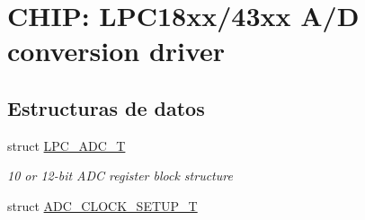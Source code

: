 \hypertarget{group___a_d_c__18_x_x__43_x_x}{}\section{C\+H\+IP\+: L\+P\+C18xx/43xx A/D conversion driver}
\label{group___a_d_c__18_x_x__43_x_x}
\subsection*{Estructuras de datos}
\begin{DoxyCompactItemize}
\item 
struct \hyperlink{struct_l_p_c___a_d_c___t}{L\+P\+C\+\_\+\+A\+D\+C\+\_\+T}
\begin{DoxyCompactList}\small\item\em 10 or 12-\/bit A\+DC register block structure \end{DoxyCompactList}\item 
struct \hyperlink{struct_a_d_c___c_l_o_c_k___s_e_t_u_p___t}{A\+D\+C\+\_\+\+C\+L\+O\+C\+K\+\_\+\+S\+E\+T\+U\+P\+\_\+T}
\end{DoxyCompactItemize}
